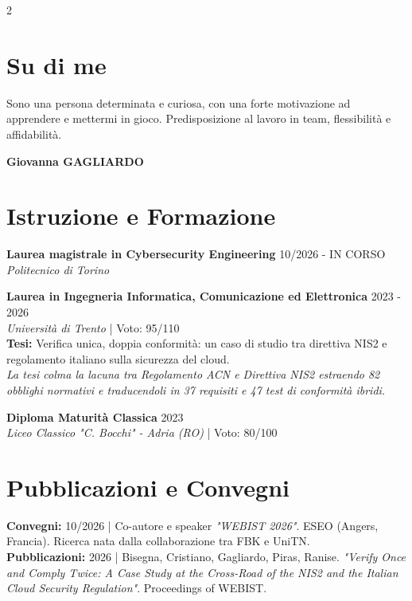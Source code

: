 \documentclass[10pt,a4paper]{article}
\begin{document}
\begin{paracol}{2}
\section*{Su di me}
Sono una persona determinata e curiosa, con una forte motivazione ad apprendere e mettermi in gioco. Predisposizione al lavoro in team, flessibilità e affidabilità. 

\switchcolumn

\vspace*{1em}
{\Huge \textbf{\textcolor{cvblue}{Giovanna GAGLIARDO}}} \\ \vspace{2em}

\section*{Istruzione e Formazione}
\textbf{Laurea magistrale in Cybersecurity Engineering} \hfill 10/2026 - IN CORSO \\
\textit{Politecnico di Torino} 

\vspace{2mm}
\textbf{Laurea in Ingegneria Informatica, Comunicazione ed Elettronica} \hfill 2023 - 2026 \\
\textit{Università di Trento} | Voto: 95/110 \\
\textbf{Tesi:} Verifica unica, doppia conformità: un caso di studio tra direttiva NIS2 e regolamento italiano sulla sicurezza del cloud. \\
\textit{La tesi colma la lacuna tra Regolamento ACN e Direttiva NIS2 estraendo 82 obblighi normativi e traducendoli in 37 requisiti e 47 test di conformità ibridi.}

\vspace{2mm}
\textbf{Diploma Maturità Classica} \hfill 2023 \\
\textit{Liceo Classico "C. Bocchi" - Adria (RO)} | Voto: 80/100

\section*{Pubblicazioni e Convegni}
\textbf{Convegni:} 10/2026 | Co-autore e speaker \textit{"WEBIST 2026"}. ESEO (Angers, Francia). Ricerca nata dalla collaborazione tra FBK e UniTN. \\
\textbf{Pubblicazioni:} 2026 | Bisegna, Cristiano, Gagliardo, Piras, Ranise. \textit{"Verify Once and Comply Twice: A Case Study at the Cross-Road of the NIS2 and the Italian Cloud Security Regulation"}. Proceedings of WEBIST.


\end{paracol}
\end{document}
